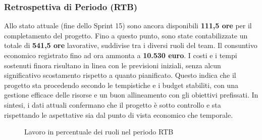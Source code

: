 \documentclass{article}
\begin{document}
                \subsubsection{Retrospettiva di Periodo (RTB)}

                Allo stato attuale (fine dello Sprint 15) sono ancora disponibili 
                \textbf{111,5 ore} per il completamento del progetto. Fino a questo punto, 
                sono state contabilizzate un totale di \textbf{541,5 ore} lavorative, 
                suddivise tra i diversi ruoli del team. Il consuntivo economico 
                registrato fino ad ora ammonta a \textbf{10.530 euro}. I costi e i tempi 
                sostenuti finora risultano in linea con le previsioni iniziali, 
                senza alcun significativo scostamento rispetto a quanto pianificato. 
                Questo indica che il progetto sta procedendo secondo le tempistiche 
                e i budget stabiliti, con una gestione efficace delle risorse e un 
                buon allineamento con gli obiettivi prefissati. In sintesi, i dati 
                attuali confermano che il progetto è sotto controllo e sta 
                rispettando le aspettative sia dal punto di vista economico che 
                temporale.



                \begin{figure}[H]
                    \centering
                    \caption{Lavoro in percentuale dei ruoli nel periodo RTB}
                \end{figure}

                \vspace{1cm}
\end{document}
